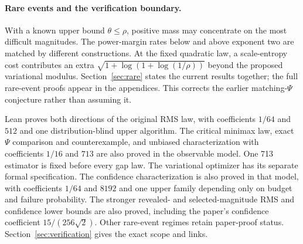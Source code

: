 \paragraph{Rare events and the verification boundary.}
With a known upper bound $\theta\le\rho$, positive mass may concentrate
on the most difficult magnitudes. The power-margin rates below and
above exponent two are matched by different constructions. At the
fixed quadratic law, a scale-entropy cost contributes an extra
$\sqrt{1+\log(1+\log(1/\rho))}$ beyond the proposed variational modulus.
Section~\ref{sec:rare} states the current results together; the full
rare-event proofs appear in the appendices. This corrects the earlier
matching-$\Psi$ conjecture rather than assuming it.

Lean proves both directions of the original RMS law, with coefficients
$1/64$ and $512$ and one distribution-blind upper algorithm. The critical
minimax law, exact $\Psi$ comparison and counterexample, and unbiased
characterization with coefficients $1/16$ and $713$ are also proved in the
observable model. One 713 estimator is fixed before every gap law. The
variational optimizer has its separate formal specification.
The confidence characterization is also proved in that model, with
coefficients $1/64$ and $8192$ and one upper family depending only on
budget and failure probability. The stronger revealed- and selected-magnitude
RMS and confidence lower bounds are also proved, including the paper's
confidence coefficient $15/(256\sqrt2)$. Other rare-event regimes
retain paper-proof status. Section~\ref{sec:verification} gives the exact
scope and links.
